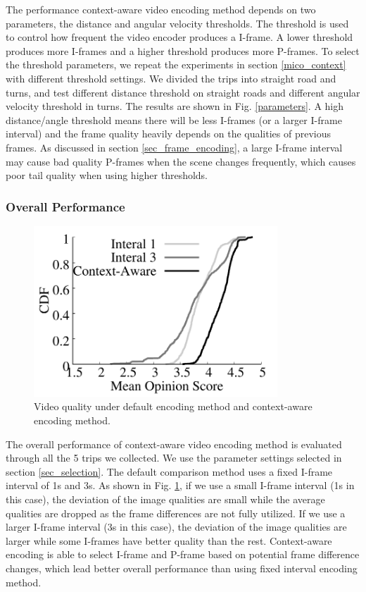 The performance context-aware video encoding method depends on
two parameters, the distance and angular velocity thresholds.
The threshold is used to control how frequent the video 
encoder produces a I-frame. 
A lower threshold produces more I-frames and a higher
threshold produces more P-frames. 
To select the threshold parameters, we repeat the 
experiments in section \ref{mico_context} with different 
threshold settings.
We divided the trips into straight road and turns, 
and test different distance threshold on straight roads and
different angular velocity threshold in turns. 
The results are shown in Fig. \ref{parameters}. 
A high distance/angle threshold means there will be less 
I-frames (or a larger I-frame interval) and the frame quality heavily depends 
on the qualities of previous frames. 
As discussed in section \ref{sec_frame_encoding}, 
a large I-frame interval may cause bad quality P-frames 
when the scene changes frequently, 
which causes poor tail quality when using higher
thresholds. 

\subsubsection{Overall Performance}



\begin{figure}[t]
\centering
\includegraphics[width=3.6in,angle=0]{Figs/RTDrive/evaluation/context_quality.pdf}
\caption{Video quality under default encoding method
and context-aware encoding method.}
\vspace{-0.2cm}
\label{context_quality}
\centering
\end{figure}


The overall performance of context-aware video encoding method is evaluated
through all the 5 trips we collected. 
We use the parameter settings selected in section \ref{sec_selection}.
The default comparison method uses a fixed I-frame interval of 1s and 3s.
As shown in Fig. \ref{context_quality}, 
if we use a small I-frame interval (1s in this case), the deviation of the image
qualities are small while the average qualities are dropped
as the frame differences are not fully utilized. 
If we use a larger I-frame interval (3s in this case), 
the deviation of the image qualities are larger while some I-frames
have better quality than the rest.
Context-aware encoding is able to select I-frame and P-frame
based on potential frame difference changes, 
which lead better overall performance than using
fixed interval encoding method.  

